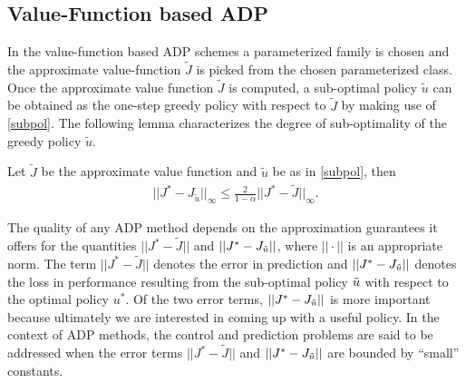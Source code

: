 \documentclass[12pt,draftcls,onecolumn]{IEEEtran}
\begin{document}
\subsection{Value-Function based ADP}
In the value-function based ADP schemes a parameterized family is chosen and the approximate value-function $\tilde{J}$ is picked from the chosen parameterized class.
Once the approximate value function $\tilde{J}$ is computed, a sub-optimal policy $\tilde{u}$ can be obtained as the one-step greedy policy with respect to $\tilde{J}$ by making use of \eqref{subpol}.
The following lemma characterizes the degree of sub-optimality of the greedy policy $\tilde{u}$.
\begin{lemma}\label{subopt}
Let $\tilde{J}$ be the approximate value function and $\tilde{u}$ be as in \eqref{subpol}, then 
\begin{align}
||J^*-J_{\tilde{u}}||_\infty \leq \frac{2}{1-\alpha}||J^*-\tilde{J}||_\infty.
\end{align}
\end{lemma}
The quality of any ADP method depends on the approximation guarantees it offers for the quantities $||J^*-\tilde{J}||$ and $||J^*-J_{\tilde{u}}||$, where $||\cdot||$ is an appropriate norm. The term  $||J^*-\tilde{J}||$ denotes the error in prediction and $||J^*-J_{\tilde{u}}||$ denotes the loss in performance resulting from the sub-optimal policy $\tilde{u}$ with respect to the optimal policy $u^*$. Of the two error terms, $||J^*-J_{\tilde{u}}||$ is more important because ultimately we are interested in coming up with a useful policy. In the context of ADP methods, the control and prediction problems are said to be addressed when the error terms $||J^*-\tilde{J}||$ and $||J^*-J_{\tilde{u}}||$ are bounded by ``small'' constants.\\
\end{document}
